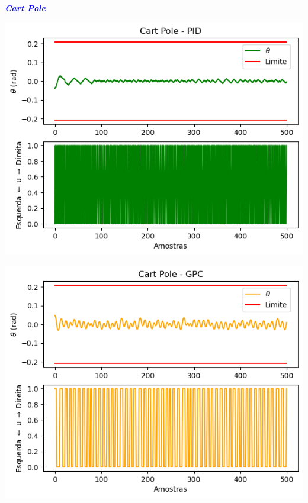 \documentclass[aspectratio=169]{beamer}
\begin{document}
\begin{frame}{\textcolor{blue}{\textbf{\textit{Cart Pole}}}}
\vspace{-.75cm}
\begin{minipage}{0.5\textwidth}
  \centering
  \includegraphics[scale=0.45]{images/ctpidio.png}
  \label{fig:imagem1}
\end{minipage}%
\begin{minipage}{0.5\textwidth}
  \centering
  \includegraphics[scale=0.45]{images/ctgpcio.png}
  \label{fig:imagem2}
\end{minipage}


\end{frame}
\end{document}
